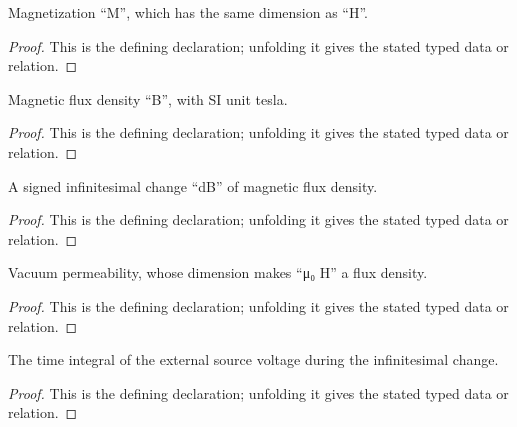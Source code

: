 \begin{definition}[DimMagnetization]
  \label{decl:physics:IPhO_2026_3_A_2:DimMagnetization}
  Magnetization “M”, which has the same dimension as “H”.
\end{definition}
\begin{proof}
  This is the defining declaration; unfolding it gives the stated typed data or relation.
\end{proof}

\begin{definition}[DimMagneticFluxDensity]
  \label{decl:physics:IPhO_2026_3_A_2:DimMagneticFluxDensity}
  Magnetic flux density “B”, with SI unit tesla.
\end{definition}
\begin{proof}
  This is the defining declaration; unfolding it gives the stated typed data or relation.
\end{proof}

\begin{definition}[DimMagneticFluxDensityIncrement]
  \label{decl:physics:IPhO_2026_3_A_2:DimMagneticFluxDensityIncrement}
  A signed infinitesimal change “dB” of magnetic flux density.
\end{definition}
\begin{proof}
  This is the defining declaration; unfolding it gives the stated typed data or relation.
\end{proof}

\begin{definition}[DimVacuumPermeability]
  \label{decl:physics:IPhO_2026_3_A_2:DimVacuumPermeability}
  Vacuum permeability, whose dimension makes “μ₀ H” a flux density.
\end{definition}
\begin{proof}
  This is the defining declaration; unfolding it gives the stated typed data or relation.
\end{proof}

\begin{definition}[DimVoltageImpulse]
  \label{decl:physics:IPhO_2026_3_A_2:DimVoltageImpulse}
  The time integral of the external source voltage during the infinitesimal change.
\end{definition}
\begin{proof}
  This is the defining declaration; unfolding it gives the stated typed data or relation.
\end{proof}


